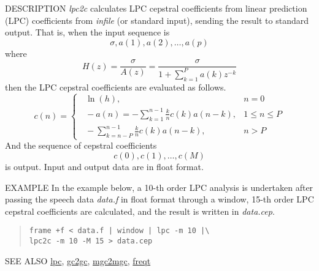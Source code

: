 \begin{synopsis}
 \item[lpc2c] [ --m $M_1$ ] [ --M $M_2$ ] [ {\em infile} ]
\end{synopsis}
\begin{qsection}{DESCRIPTION}
{\em lpc2c} calculates LPC cepstral coefficients 
from linear prediction (LPC) coefficients 
from {\em infile} (or standard input), 
sending the result to standard output.
That is, when the input sequence is 
\begin{displaymath} 
   \sigma, a(1), a(2), \dots, a(p) 
\end{displaymath}
where
\begin{displaymath}
   H(z)=\frac{\sigma}{A(z)}=\frac{\sigma}{\displaystyle 1+\sum_{k=1}^P a(k) z^{-k}}
\end{displaymath}
then the LPC cepstral coefficients are evaluated as follows.
\begin{displaymath}
   c(n) = \begin{cases}
 \;\; \ln(h),&n=0\\
 \;\; \displaystyle -a(n)=-\sum^{n-1}_{k=1}\frac{k}{n}c(k) a(n-k),&1\leq n\leq P\\ 
 \;\; \displaystyle -\sum_{k=n-P}^{n-1}\frac{k}{n}c(k) a(n-k),& n>P
\end{cases}
\end{displaymath}
And the sequence of cepstral coefficients
\begin{displaymath}
   c(0), c(1), \dots, c(M)
\end{displaymath}
is output.
Input and output data are in float format.
\end{qsection}

\begin{options}
\end{options}

\begin{qsection}{EXAMPLE}
In the example below, a 10-th order LPC analysis is undertaken after
passing the speech data {\em data.f} in float format through a window,
15-th order LPC cepstral coefficients are calculated,
and the result is written in {\em data.cep}.
\begin{quote}
 \verb!frame +f < data.f | window | lpc -m 10 |\!\\
 \verb!lpc2c -m 10 -M 15 > data.cep!
\end{quote}
\end{qsection}

\begin{qsection}{SEE ALSO}
\hyperlink{lpc}{lpc},
\hyperlink{gc2gc}{gc2gc},
\hyperlink{mgc2mgc}{mgc2mgc},
\hyperlink{freqt}{freqt}
\end{qsection}
